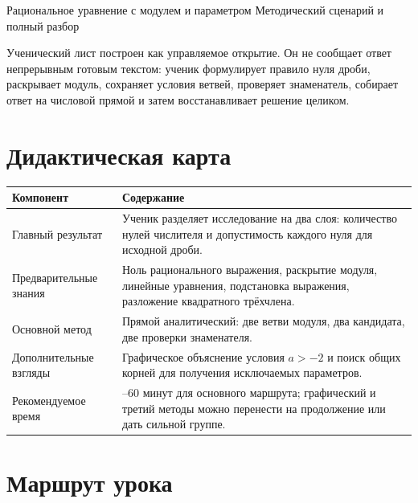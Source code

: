 \worksheettitle
  {Рациональное уравнение с модулем и параметром}
  {Методический сценарий и полный разбор}

\begin{teacherbox}
  Ученический лист построен как управляемое открытие. Он не сообщает ответ
  непрерывным готовым текстом: ученик формулирует правило нуля дроби,
  раскрывает модуль, сохраняет условия ветвей, проверяет знаменатель,
  собирает ответ на числовой прямой и затем восстанавливает решение целиком.
\end{teacherbox}

\section{Дидактическая карта}

\begin{center}
  \renewcommand{\arraystretch}{1.38}
  \begin{tabularx}{\textwidth}{
    >{\raggedright\arraybackslash}p{}
    >{\raggedright\arraybackslash}X}
    \toprule
    \rowcolor{TableHeader}
    Компонент & Содержание \\
    \midrule
    Главный результат
      & Ученик разделяет исследование на два слоя: количество нулей
        числителя и допустимость каждого нуля для исходной дроби. \\
    \addlinespace[0.25em]
    Предварительные знания
      & Ноль рационального выражения, раскрытие модуля, линейные уравнения,
        подстановка выражения, разложение квадратного трёхчлена. \\
    \addlinespace[0.25em]
    Основной метод
      & Прямой аналитический: две ветви модуля, два кандидата,
        две проверки знаменателя. \\
    \addlinespace[0.25em]
    Дополнительные взгляды
      & Графическое объяснение условия \(a>-2\) и поиск общих корней для
        получения исключаемых параметров. \\
    \addlinespace[0.25em]
    Рекомендуемое время
      & 45--60 минут для основного маршрута; графический и третий методы
        можно перенести на продолжение или дать сильной группе. \\
    \bottomrule
  \end{tabularx}
\end{center}

\section{Маршрут урока}

